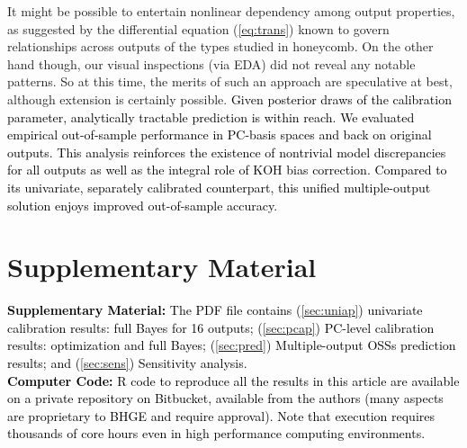 \documentclass[12pt]{article}
\newcommand{\blu}[1]{\textcolor{black}{#1}} %
\newcommand{\blunew}[1]{\textcolor{black}{#1}} %
\begin{document}
It might be possible to entertain nonlinear dependency among output
properties, as suggested by the differential equation (\ref{eq:trans}) known
to govern relationships across outputs of the types studied in honeycomb.  On
the other hand though, our visual inspections (via EDA) did not reveal any
notable patterns.  So at this time, the merits of such an approach are
speculative at best, although extension is certainly possible.  
 \blu{Given posterior draws of the calibration parameter, analytically tractable
prediction is within reach. We evaluated empirical out-of-sample performance
in PC-basis spaces and back on original outputs. This analysis reinforces the
existence of nontrivial model discrepancies for all outputs as well as the
integral role of KOH bias correction. Compared to its univariate, separately
calibrated counterpart, this unified multiple-output solution enjoys
improved out-of-sample accuracy. }

\section*{Supplementary Material}

\blunew{
\textbf{Supplementary Material:} The PDF file contains (\ref{sec:uniap}) 
univariate calibration results: full Bayes for 16 outputs; (\ref{sec:pcap})
PC-level  calibration results: optimization and full Bayes; 
(\ref{sec:pred}) Multiple-output OSSs prediction results; and
(\ref{sec:sens}) Sensitivity analysis.} \\

\noindent \blunew{ \textbf{Computer Code:} {\sf R} code to reproduce 
all the results in this article are available on a private repository on
Bitbucket, available from the authors (many aspects are proprietary to BHGE
and require approval). %
Note that execution requires thousands of core hours even in
high performance computing environments.}
\end{document}
